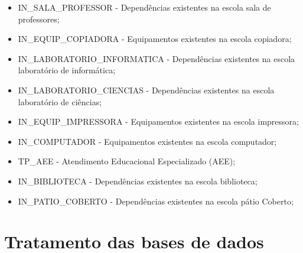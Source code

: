 \begin{itemize}
	\item IN\_SALA\_PROFESSOR - Dependências existentes na escola sala de professores;
	\item IN\_EQUIP\_COPIADORA - Equipamentos existentes na escola copiadora;
	\item IN\_LABORATORIO\_INFORMATICA - Dependências existentes na escola laboratório de informática;
	\item IN\_LABORATORIO\_CIENCIAS - Dependências existentes na escola laboratório de ciências;
	\item IN\_EQUIP\_IMPRESSORA - Equipamentos existentes na escola impressora;
	\item IN\_COMPUTADOR - Equipamentos existentes na escola computador;
	\item TP\_AEE - Atendimento Educacional Especializado (AEE);
	\item IN\_BIBLIOTECA -  Dependências existentes na escola biblioteca;
	\item IN\_PATIO\_COBERTO - Dependências existentes na escola pátio Coberto;
\end{itemize}
\section{Tratamento das bases de dados}
